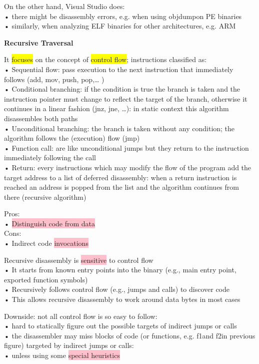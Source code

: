 \documentclass[]{project_plan}
\begin{document}
On the other hand, Visual Studio does:\\
• there might be disassembly errors, e.g. when using objdumpon PE binaries\\
• similarly, when analyzing ELF binaries for other architectures, e.g. ARM

\textbf{Recursive Traversal}

It \colorbox{yellow}{focuses} on the concept of \colorbox{yellow}{control flow}; instructions classified as:\\
• Sequential flow: pass execution to the next instruction that immediately follows (add,
mov, push, pop,… )\\
• Conditional branching: if the condition is true the branch is taken and the instruction pointer
must change to reflect the target of the branch, otherwise it continues in a linear fashion (jnz,
jne, …): in static context this algorithm disassembles both paths\\
• Unconditional branching: the branch is taken without any condition; the algorithm
follows the (execution) flow (jmp)\\
• Function call: are like unconditional jumps but they return to the instruction immediately
following the call\\
• Return: every instructions which may modify the flow of the program add the target address
to a list of deferred disassembly:
when a return instruction is reached an address is popped from the list and the algorithm continues
from there (recursive algorithm)

Pros:\\
• \colorbox{pink}{Distinguish code from data}\\
Cons:\\
• Indirect code \colorbox{pink}{invocations}

Recursive disassembly is \colorbox{pink}{sensitive} to control flow\\
• It starts from known entry points into the binary (e.g., main entry point, exported
function symbols)\\
• Recursively follows control flow (e.g., jumps and calls) to discover code\\
• This allows recursive disassembly to work around data bytes in most cases

Downside: not all control flow is so easy to follow:\\
• hard to statically figure out the possible targets of indirect jumps or calls\\
• the disassembler may miss blocks of code (or functions, e.g. f1and f2in previous figure)
targeted by indirect jumps or calls:\\
• unless using some \colorbox{pink}{special heuristics}
\end{document}
